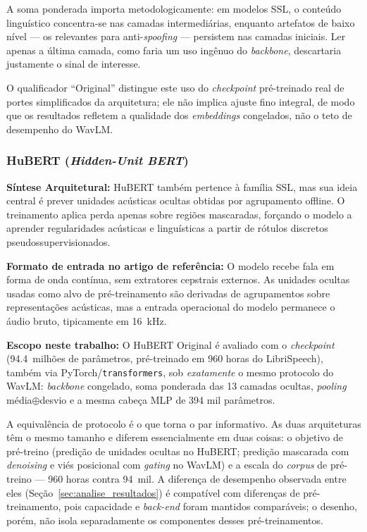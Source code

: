\documentclass[12pt,a4paper]{article}
\begin{document}
A soma ponderada importa metodologicamente: em modelos SSL, o conteúdo
linguístico concentra-se nas camadas intermediárias, enquanto artefatos de
baixo nível --- os relevantes para anti-\textit{spoofing} --- persistem nas
camadas iniciais. Ler apenas a última camada, como faria um uso ingênuo do
\textit{backbone}, descartaria justamente o sinal de interesse.

O qualificador ``Original'' distingue este uso do \textit{checkpoint}
pré-treinado real de portes simplificados da arquitetura; ele não implica
ajuste fino integral, de modo que os resultados refletem a qualidade dos
\textit{embeddings} congelados, não o teto de desempenho do WavLM.

\subsubsection[HuBERT]{HuBERT (\textit{Hidden-Unit BERT})~\cite{hsu2021hubert}}
\textbf{Síntese Arquitetural:} HuBERT também pertence à família SSL, mas sua
ideia central é prever unidades acústicas ocultas obtidas por agrupamento
offline. O treinamento aplica perda apenas sobre regiões mascaradas, forçando o
modelo a aprender regularidades acústicas e linguísticas a partir de rótulos
discretos pseudossupervisionados.

\par\textbf{Formato de entrada no artigo de referência:} O modelo recebe fala
em forma de onda contínua, sem extratores cepstrais externos. As unidades
ocultas usadas como alvo de pré-treinamento são derivadas de agrupamentos sobre
representações acústicas, mas a entrada operacional do modelo permanece o
áudio bruto, tipicamente em \SI{16}{\kilo\hertz}.

\par\textbf{Escopo neste trabalho:} O HuBERT Original é avaliado com o
\textit{checkpoint}  (\num{94,4}~milhões de
parâmetros, pré-treinado em \num{960} horas do LibriSpeech), também via
PyTorch/\texttt{transformers}, sob \emph{exatamente} o mesmo protocolo do
WavLM: \textit{backbone} congelado, soma ponderada das \num{13} camadas
ocultas, \textit{pooling} média$\oplus$desvio e a mesma cabeça MLP de
\num{394} mil parâmetros.

A equivalência de protocolo é o que torna o par informativo. As duas
arquiteturas têm o mesmo tamanho e diferem essencialmente em duas coisas: o
objetivo de pré-treino (predição de unidades ocultas no HuBERT; predição
mascarada com \textit{denoising} e viés posicional com \textit{gating} no
WavLM) e a escala do \textit{corpus} de pré-treino --- \num{960} horas contra
\num{94}~mil. A diferença de desempenho observada entre eles
(Seção~\ref{sec:analise_resultados}) é compatível com diferenças de
pré-treinamento, pois capacidade e \textit{back-end} foram mantidos
comparáveis; o desenho, porém, não isola separadamente os componentes desses
pré-treinamentos.
\end{document}

